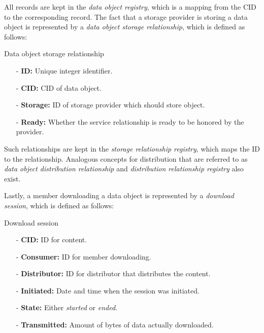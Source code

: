\documentclass{article}
\newenvironment{concept_box}[1]
    {
    \begin{tcolorbox}
    {\large \textbf{#1} }
    }
    {
    \end{tcolorbox}
    }
\begin{document}
All records are kept in the \textit{data object registry}, which is a mapping from the CID to the corresponding record. The fact that a storage provider is storing a data object is represented by a \textit{data object storage relationship}, which is defined as follows: \\

\begin{concept_box}{Data object storage relationship}
    \begin{itemize}

      \item[-] \textbf{ID:} Unique integer identifier.

      \item[-] \textbf{CID:} CID of data object.

      \item[-] \textbf{Storage:} ID of storage provider which should store object.

      \item[-] \textbf{Ready:} Whether the service relationship is ready to be honored by the provider.

    \end{itemize}
\end{concept_box}

Such relationships are kept in the \textit{storage relationship registry}, which maps the ID to the relationship. Analogous concepts for distribution that are referred to as \textit{data object distribution relationship} and \textit{distribution relationship registry} also exist.

Lastly, a member downloading a data object is represented by a \textit{download session}, which is defined as follows: \\

\begin{concept_box}{Download session}

    \begin{itemize}

      \item[-] \textbf{CID:} ID for content.

      \item[-] \textbf{Consumer:} ID for member downloading.

      \item[-] \textbf{Distributor:} ID for distributor that distributes the content.

      \item[-] \textbf{Initiated:} Date and time when the session was initiated.

      \item[-] \textbf{State:} Either \textit{started} or \textit{ended}.

      \item[-] \textbf{Transmitted:} Amount of bytes of data actually downloaded.

    \end{itemize}

\end{concept_box}
\end{document}
